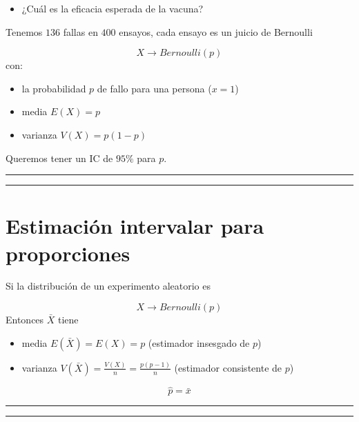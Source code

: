 \documentclass[
]{book}
\providecommand{\tightlist}{%
  \setlength{\itemsep}{0pt}\setlength{\parskip}{0pt}}
\begin{document}
\begin{itemize}
\tightlist
\item
  ¿Cuál es la eficacia esperada de la vacuna?
\end{itemize}

Tenemos \(136\) fallas en \(400\) ensayos, cada ensayo es un
juicio de Bernoulli

\[X \rightarrow Bernoulli(p)\]
con:

\begin{itemize}
\tightlist
\item
  la probabilidad \(p\) de fallo para una persona (\(x=1\))
\item
  media \(E (X) = p\)
\item
  varianza \(V (X) = p (1-p)\)
\end{itemize}

Queremos tener un IC de \(95\%\) para \(p\).

\begin{center}\rule{0.5\linewidth}{0.5pt}\end{center}

\begin{center}\rule{0.5\linewidth}{0.5pt}\end{center}

\hypertarget{estimaciuxf3n-intervalar-para-proporciones-1}{%
\section{Estimación intervalar para proporciones}\label{estimaciuxf3n-intervalar-para-proporciones-1}}

Si la distribución de un experimento aleatorio es

\[X \rightarrow Bernoulli (p)\]
Entonces \(\bar{X}\) tiene

\begin{itemize}
\tightlist
\item
  media \(E(\bar{X})=E(X)=p\) (estimador insesgado de \(p\))
\item
  varianza \(V(\bar{X})=\frac{V(X)}{n}=\frac{p(p-1)}{n}\) (estimador consistente de \(p\))
\end{itemize}

\[\hat{p}=\bar{x}\]

\begin{center}\rule{0.5\linewidth}{0.5pt}\end{center}

\begin{center}\rule{0.5\linewidth}{0.5pt}\end{center}
\end{document}
